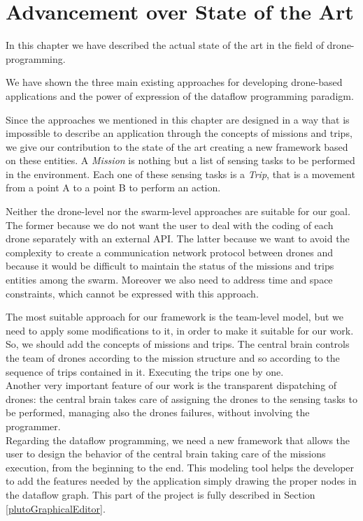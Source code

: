 \section{Advancement over State of the Art}\label{advancement}

In this chapter we have described the actual state of the art in the field of drone-programming.

We have shown the three main existing approaches for developing drone-based applications and the power of expression of the dataflow programming paradigm.

Since the approaches we mentioned in this chapter are designed in a way that is impossible to describe an application through the concepts of missions and trips, we give our contribution to the state of the art creating a new framework based on these entities.
A \textit{Mission} is nothing but a list of sensing tasks to be performed in the environment.
Each one of these sensing tasks is a \textit{Trip}, that is a movement from a point A to a point B to perform an action.

Neither the drone-level nor the swarm-level approaches are suitable for our goal. 
The former because we do not want the user to deal with the coding of each drone separately with an external API.
The latter because we want to avoid the complexity to create a communication network protocol between drones and because it would be difficult to maintain the status of the missions and trips entities among the swarm. Moreover we also need to address  time and space constraints, which cannot be expressed with this approach.

The most suitable approach for our framework is the team-level model, but we need to apply some modifications to it, in order to make it suitable for our work.
So, we should add the concepts of missions and trips. 
The central brain controls the team of drones according to the mission structure and so according to the sequence of trips contained in it. Executing the trips one by one.
\\

Another very important feature of our work is the transparent dispatching of drones:
the central brain takes care of assigning the drones to the sensing tasks to be performed, managing also the drones failures, without involving the programmer.
\\

Regarding the dataflow programming, we need a new framework that allows the user to design the behavior of the central brain taking care of the missions execution, from the beginning to the end. 
This modeling tool helps the developer to add the features needed by the application simply drawing the proper nodes in the dataflow graph. 
This part of the project is fully described in Section \ref{plutoGraphicalEditor}.



